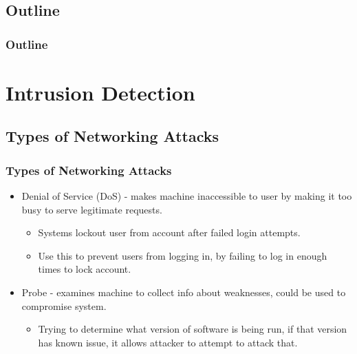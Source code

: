 \documentclass{beamer}
\newcommand{\linespace}{\vskip 0.25cm}
\begin{document}
\subsection*{Outline}

\begin{frame}
  \frametitle{Outline}
  \tableofcontents[hideallsubsections]
\end{frame}
\section[Intrusion Detection]{Intrusion Detection}
\subsection{Types of Networking Attacks}
\begin{frame}
  \frametitle{Types of Networking Attacks}
  \begin{itemize}
  	\item Denial of Service (DoS) - makes machine inaccessible to user by making it too busy to serve legitimate requests.
  	
  	\begin{itemize}
  		\item Systems lockout user from account after failed login attempts. 
  		\item Use this to prevent users from logging in, by failing to log in enough times to lock account.
  	\end{itemize}

  	\linespace
  	\linespace
  	\linespace
  	
  	\item Probe - examines machine to collect info about weaknesses, could be used to compromise system.
  	
  	\begin{itemize}
  		\item Trying to determine what version of software is being run, if that version has known issue, it allows attacker to attempt to attack that.
  	\end{itemize}
  \end{itemize}
\end{frame}
\end{document}
